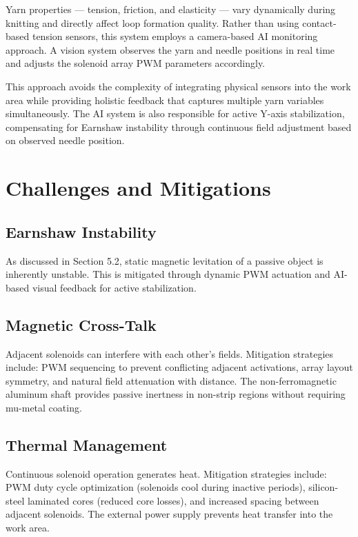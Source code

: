 \documentclass[12pt, a4paper]{article}
\begin{document}
Yarn properties --- tension, friction, and elasticity --- vary dynamically
during knitting and directly affect loop formation quality. Rather than
using contact-based tension sensors, this system employs a camera-based
AI monitoring approach. A vision system observes the yarn and needle
positions in real time and adjusts the solenoid array PWM parameters
accordingly.

This approach avoids the complexity of integrating physical sensors into
the work area while providing holistic feedback that captures multiple
yarn variables simultaneously. The AI system is also responsible for
active Y-axis stabilization, compensating for Earnshaw instability
through continuous field adjustment based on observed needle position.

\section{Challenges and Mitigations}

\subsection{Earnshaw Instability}
As discussed in Section 5.2, static magnetic levitation of a passive
object is inherently unstable. This is mitigated through dynamic PWM
actuation and AI-based visual feedback for active stabilization.

\subsection{Magnetic Cross-Talk}
Adjacent solenoids can interfere with each other's fields. Mitigation
strategies include: PWM sequencing to prevent conflicting adjacent
activations, array layout symmetry, and natural field attenuation with
distance. The non-ferromagnetic aluminum shaft provides passive
inertness in non-strip regions without requiring mu-metal coating.

\subsection{Thermal Management}
Continuous solenoid operation generates heat. Mitigation strategies
include: PWM duty cycle optimization (solenoids cool during inactive
periods), silicon-steel laminated cores (reduced core losses), and
increased spacing between adjacent solenoids. The external power supply
prevents heat transfer into the work area.
\end{document}
